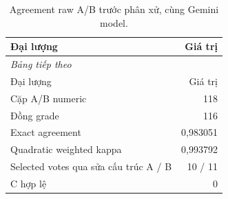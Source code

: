 \begingroup\small\setlength{\tabcolsep}{4pt}\renewcommand{\arraystretch}{1.16}
\begin{longtable}{p{.68\linewidth}r}
\caption{Agreement raw A/B trước phân xử, cùng Gemini model.}\label{tab:agreement}\\
\toprule Đại lượng & Giá trị \\
\midrule\endfirsthead
\multicolumn{2}{l}{\textit{Bảng tiếp theo}}\\
\toprule Đại lượng & Giá trị \\
\midrule\endhead
\bottomrule\endfoot
Cặp A/B numeric & 118 \\
Đồng grade & 116 \\
Exact agreement & 0,983051 \\
Quadratic weighted kappa & 0,993792 \\
Selected votes qua sửa cấu trúc A / B & 10 / 11 \\
C hợp lệ & 0 \\
\end{longtable}\endgroup
{}
